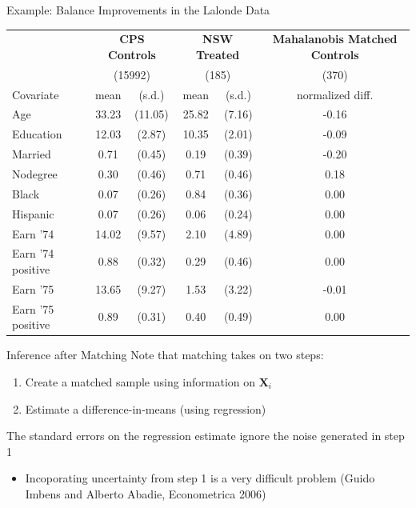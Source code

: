 \documentclass[aspectratio=169,t,11pt,table]{beamer}
\begin{document}
\begin{frame}{Example: Balance Improvements in the Lalonde Data} 
  \begin{table}   
    \footnotesize
    \begin{tabular}{l c c c c c}
      \toprule
      & \multicolumn{2}{c}{\textbf{CPS Controls}} & \multicolumn{2}{c}{\textbf{NSW Treated}} &  \multicolumn{1}{c}{\textbf{Mahalanobis Matched Controls}} \\
      & \multicolumn{2}{c}{(15992)} & \multicolumn{2}{c}{(185)} & (370) \\
      Covariate & mean & (s.d.) & mean & (s.d.) & normalized diff. \\

      \midrule
      Age & 33.23 & (11.05) & 25.82 & (7.16) & -0.16 \\
      Education & 12.03 & (2.87) & 10.35 & (2.01) & -0.09 \\
      Married & 0.71 & (0.45) & 0.19 & (0.39) & -0.20 \\
      Nodegree & 0.30 & (0.46) & 0.71 & (0.46) & 0.18 \\
      Black & 0.07 & (0.26) & 0.84 & (0.36) & 0.00 \\
      Hispanic & 0.07 & (0.26) & 0.06 & (0.24) & 0.00 \\
      Earn '74 & 14.02 & (9.57) & 2.10 & (4.89) & 0.00 \\
      Earn '74 positive & 0.88 & (0.32) & 0.29 & (0.46) & 0.00 \\
      Earn '75 & 13.65 & (9.27) & 1.53 & (3.22) & -0.01 \\
      Earn '75 positive & 0.89 & (0.31) & 0.40 & (0.49) & 0.00 \\
      \bottomrule
    \end{tabular}
  \end{table}
\end{frame}

\begin{frame}{Inference after Matching}
  Note that matching takes on two steps:
  \begin{enumerate}
    \item Create a matched sample using information on $\bm{X}_i$
    \item Estimate a difference-in-means (using regression)
  \end{enumerate}

  The standard errors on the regression estimate ignore the noise generated in step 1
  \begin{itemize}
    \item Incoporating uncertainty from step 1 is a very difficult problem (Guido Imbens and Alberto Abadie, Econometrica 2006)
  \end{itemize}
\end{frame}
\end{document}
